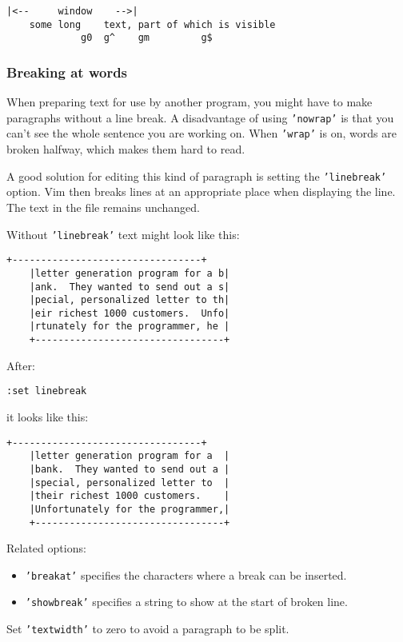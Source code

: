 \begin{Verbatim}[samepage=true]
            |<--     window    -->|
    some long    text, part of which is visible
             g0  g^    gm         g$
\end{Verbatim}

\subsubsection{Breaking at words}
\label{edit-no-break}
When preparing text for use by another program, you might have to make paragraphs without a line break.
A disadvantage of using \texttt{'nowrap'} is that you can't see the whole sentence you are working on.
When \texttt{'wrap'} is on, words are broken halfway, which makes them hard to read.

A good solution for editing this kind of paragraph is setting the \texttt{'linebreak'} option.
Vim then breaks lines at an appropriate place when displaying the line.
The text in the file remains unchanged.

Without \texttt{'linebreak'} text might look like this:

\begin{Verbatim}[samepage=true]
    +---------------------------------+
    |letter generation program for a b|
    |ank.  They wanted to send out a s|
    |pecial, personalized letter to th|
    |eir richest 1000 customers.  Unfo|
    |rtunately for the programmer, he |
    +---------------------------------+
\end{Verbatim}

After:

\begin{Verbatim}[samepage=true]
 :set linebreak
\end{Verbatim}

it looks like this:

\begin{Verbatim}[samepage=true]
    +---------------------------------+
    |letter generation program for a  |
    |bank.  They wanted to send out a |
    |special, personalized letter to  |
    |their richest 1000 customers.    |
    |Unfortunately for the programmer,|
    +---------------------------------+
\end{Verbatim}

Related options:
\begin{itemize}
				\item \texttt{'breakat'} specifies the characters where a break can be inserted.
				\item \texttt{'showbreak'} specifies a string to show at the start of broken line.
\end{itemize}
Set \texttt{'textwidth'} to zero to avoid a paragraph to be split.
